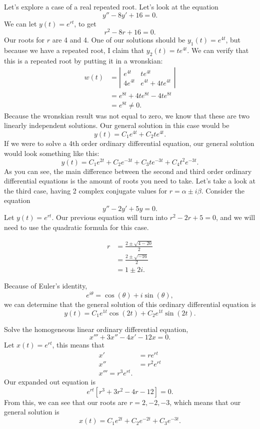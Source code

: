   Let's explore a case of a real repeated root. Let's look at the equation
  \[
  y''-8y'+16=0 
  .\] 
  We can let $y(t)=e^{rt}$, to get
  \[
  r^2-8r+16=0
  .\] 
  Our roots for $r$ are 4 and 4. One of our solutions should be $y_1(t)=e^{4t}$, but because we have a repeated root, I claim that $y_2(t)=te^{4t}$. We can verify that this is a repeated root by putting it in a wronskian:
    \begin{align*}
      w(t)&=\left| 
      \begin{matrix}
        e^{4t}&te^{4t}\\
        4e^{4t}&e^{4t}+4te^{4t}
      \end{matrix}
      \right|\\
          &=e^{8t}+4te^{8t}-4te^{8t}\\
          &=e^{8t}\neq 0
    .\end{align*}
    Because the wronskian result was not equal to zero, we know that these are two linearly independent solutions. Our general solution in this case would be
    \[
      y(t)=C_1e^{4t}+C_2te^{4t}
    .\] 
    If we were to solve a 4th order ordinary differential equation, our general solution would look something like this:
    \[
      y(t)=C_1e^{2t}+C_2e^{-3t}+C_3te^{-3t}+C_4t^2e^{-3t}
    .\] 
    As you can see, the main difference between the second and third order ordinary differential equations is the amount of roots you need to take. Let's take a look at the third case, having 2 complex conjugate values for $r=\alpha\pm i\beta$.\newline\newline
    Consider the equation
    \[
    y''-2y'+5y=0
    .\] 
    Let $y(t)=e^{rt}$. Our previous equation will turn into $r^2-2r+5=0$, and we will need to use the quadratic formula for this case.

    \begin{align*}
      r&=\frac{2\pm\sqrt{4-20} }{2}\\
       &=\frac{2\pm\sqrt{-16} }{2}\\
       &=1\pm 2i
    .\end{align*}

    Because of Euler's identity,
    \[
      e^{i\theta}=\cos(\theta)+i\sin(\theta)
    ,\]
    we can determine that the general solution of this ordinary differential equation is
    \[
    y(t)=C_1e^{1t}\cos(2t)+C_2e^{1t}\sin(2t)
    .\] 
    \begin{eg}
      Solve the homogeneous linear ordinary differential equation,
      \[
      x'''+3x''-4x'-12x=0
      .\] 
      Let $x(t)=e^{rt}$, this means that 
      \begin{align*}
        x'&=re^{rt}\\
        x''&=r^2e^{rt}\\
        x'''=r^3e^{rt}
      .\end{align*}
    Our expanded out equation is 
    \[
      e^{rt}[r^3+3r^2-4r-12]=0
    .\] 
    From this, we can see that our roots are $r=2,-2,-3$, which means that our general solution is
    \[
      x(t)=C_1e^{2t}+C_2e^{-2t}+C_3e^{-3t}
    .\] 
    \end{eg}

